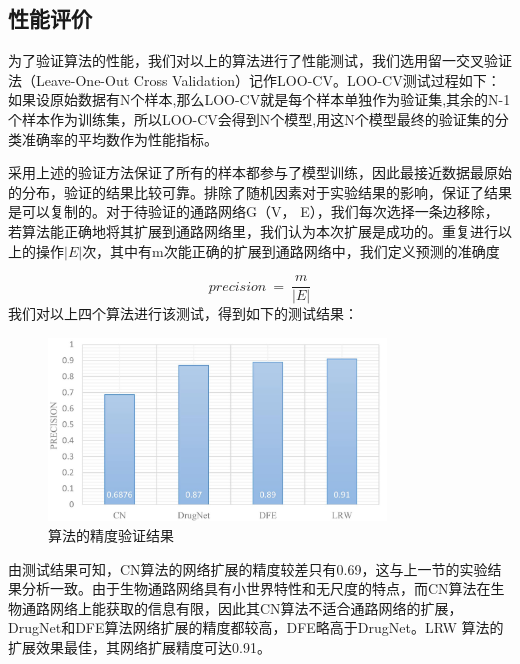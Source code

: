  \subsection{性能评价}
 为了验证算法的性能，我们对以上的算法进行了性能测试，我们选用留一交叉验证法（Leave-One-Out Cross Validation）记作LOO-CV。LOO-CV测试过程如下：如果设原始数据有N个样本,那么LOO-CV就是每个样本单独作为验证集,其余的N-1个样本作为训练集，所以LOO-CV会得到N个模型,用这N个模型最终的验证集的分类准确率的平均数作为性能指标。

 采用上述的验证方法保证了所有的样本都参与了模型训练，因此最接近数据最原始的分布，验证的结果比较可靠。排除了随机因素对于实验结果的影响，保证了结果是可以复制的。对于待验证的通路网络G（V， E），我们每次选择一条边移除，若算法能正确地将其扩展到通路网络里，我们认为本次扩展是成功的。重复进行以上的操作$|E|$次，其中有m次能正确的扩展到通路网络中，我们定义预测的准确度

\begin{equation}
precision\ =\ \frac{m}{|E|}
\end{equation}
我们对以上四个算法进行该测试，得到如下的测试结果：
\begin{figure}[h]
\centering
\includegraphics[width = 0.8\textwidth]{precision}
\caption[precision]{算法的精度验证结果}
\label{precision}
\end{figure}

由测试结果可知，CN算法的网络扩展的精度较差只有0.69，这与上一节的实验结果分析一致。由于生物通路网络具有小世界特性和无尺度的特点，而CN算法在生物通路网络上能获取的信息有限，因此其CN算法不适合通路网络的扩展，DrugNet和DFE算法网络扩展的精度都较高，DFE略高于DrugNet。LRW 算法的扩展效果最佳，其网络扩展精度可达0.91。

